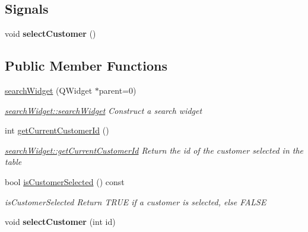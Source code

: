 \subsection*{Signals}
\begin{DoxyCompactItemize}
\item 
\hypertarget{classGui_1_1Widgets_1_1searchWidget_a9b6248c515bac4b6f58237c2f73d804b}{void {\bfseries select\+Customer} ()}\label{classGui_1_1Widgets_1_1searchWidget_a9b6248c515bac4b6f58237c2f73d804b}

\end{DoxyCompactItemize}
\subsection*{Public Member Functions}
\begin{DoxyCompactItemize}
\item 
\hyperlink{classGui_1_1Widgets_1_1searchWidget_a8d77bcf326543f841d1c05fe9819183f}{search\+Widget} (Q\+Widget $\ast$parent=0)
\begin{DoxyCompactList}\small\item\em \hyperlink{classGui_1_1Widgets_1_1searchWidget_a8d77bcf326543f841d1c05fe9819183f}{search\+Widget\+::search\+Widget} Construct a search widget \end{DoxyCompactList}\item 
int \hyperlink{classGui_1_1Widgets_1_1searchWidget_a93c6519cc7e0d8f440451d14fb85bd31}{get\+Current\+Customer\+Id} ()
\begin{DoxyCompactList}\small\item\em \hyperlink{classGui_1_1Widgets_1_1searchWidget_a93c6519cc7e0d8f440451d14fb85bd31}{search\+Widget\+::get\+Current\+Customer\+Id} Return the id of the customer selected in the table \end{DoxyCompactList}\item 
bool \hyperlink{classGui_1_1Widgets_1_1searchWidget_a3cb27e088874c5b8c548d0346a5d85f2}{is\+Customer\+Selected} () const 
\begin{DoxyCompactList}\small\item\em is\+Customer\+Selected Return T\+R\+U\+E if a customer is selected, else F\+A\+L\+S\+E \end{DoxyCompactList}\item 
\hypertarget{classGui_1_1Widgets_1_1searchWidget_a96ba18927785257377dcd3701d41e8d1}{void {\bfseries select\+Customer} (int id)}\label{classGui_1_1Widgets_1_1searchWidget_a96ba18927785257377dcd3701d41e8d1}

\end{DoxyCompactItemize}


